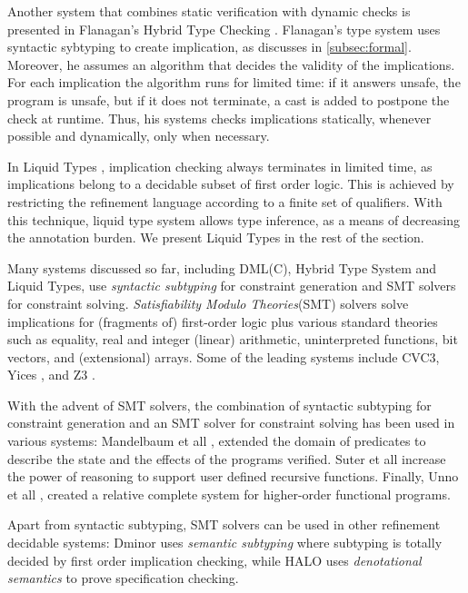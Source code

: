 Another system that combines static verification with dynamic checks is presented in 
Flanagan's Hybrid Type Checking \cite{flanagan06}. 
Flanagan's type system uses syntactic sybtyping to create implication, as discusses in
\ref{subsec:formal}. 
Moreover, he assumes an algorithm that decides the validity of the implications.
For each implication the algorithm runs for limited time: 
if it answers unsafe, the program is unsafe, 
but if it does not terminate, a cast is added to postpone the check 
at runtime.
%
Thus, his systems
checks implications statically, whenever possible
and dynamically, only when necessary.

In Liquid Types \cite{LiquidPLDI08}, 
implication checking always terminates in limited time, 
as implications belong to 
a decidable subset of first order logic.
This is achieved by restricting the refinement language
according to a finite set of qualifiers.
With this technique, liquid type system allows 
type inference, as a means of decreasing the annotation burden.
We present Liquid Types in the rest of the section.

Many systems discussed so far, including DML(C), Hybrid Type System and Liquid Types, 
use \textit{syntactic subtyping} for constraint 
generation and SMT solvers for constraint solving.
\textit{Satisfiability Modulo Theories}(SMT) solvers solve implications 
for (fragments of) first-order logic plus various standard theories such as
equality, real and integer (linear) arithmetic, uninterpreted functions, bit vectors, and (extensional) arrays. 
Some of the leading systems include  CVC3\cite{CVC3}, Yices \cite{Yices}, and Z3 \cite{z3}.

With the advent of SMT solvers, 
the combination of syntactic subtyping for constraint generation
and an SMT solver for constraint solving has been used in various systems:
%
Mandelbaum et all \cite{MandelbaumWalker03},
extended the domain of predicates to describe the state 
and the effects of the programs verified.
%
Suter et all \cite{SuterKK11} increase the power of reasoning 
to support user defined recursive functions.
Finally,  Unno et all \cite{UnnoTK13},
created a relative complete system for higher-order functional programs.
 
Apart from syntactic subtyping, SMT solvers can be used in other 
refinement decidable systems:
Dminor \cite{dminor} uses \textit{semantic subtyping} where subtyping is totally 
decided by first order implication checking, while 
HALO \cite{VytiniotisJCR13} uses \textit{denotational semantics}
to prove specification checking.




